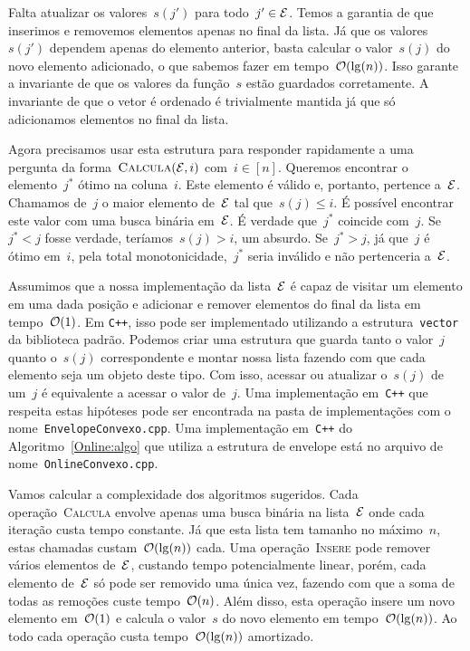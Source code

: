 Falta atualizar os valores~$s(j')$ para todo~$j' \in \mathcal{E}$. Temos a garantia de que inserimos e removemos elementos apenas no final da lista. Já que os valores~$s(j')$ dependem apenas do elemento anterior, basta calcular o valor~$s(j)$ do novo elemento adicionado, o que sabemos fazer em tempo~$\mathcal{O}(\lg(n))$. Isso garante a invariante de que os valores da função~$s$ estão guardados corretamente. A invariante de que o vetor é ordenado é trivialmente mantida já que só adicionamos elementos no final da lista.

Agora precisamos usar esta estrutura para responder rapidamente a uma pergunta da forma~${ \textsc{Calcula}(\mathcal{E},i) }$ com~$i \in [n]$. Queremos encontrar o elemento~$j^*$ ótimo na coluna~$i$. Este elemento é válido e, portanto, pertence a~$\mathcal{E}$. Chamamos de~$j$ o maior elemento de~$\mathcal{E}$ tal que~$s(j) \leq i$. É possível encontrar este valor com uma busca binária em~$\mathcal{E}$. É verdade que~$j^*$ coincide com~$j$. Se~${ j^* < j }$ fosse verdade, teríamos~${ s(j) > i }$, um absurdo. Se~${ j^* > j }$, já que~$j$ é ótimo em~$i$, pela total monotonicidade,~$j^*$ seria inválido e não pertenceria a~$\mathcal{E}$.

Assumimos que a nossa implementação da lista~$\mathcal{E}$ é capaz de visitar um elemento em uma dada posição e adicionar e remover elementos do final da lista em tempo~$\mathcal{O}(1)$. Em \texttt{C++}, isso pode ser implementado utilizando a estrutura~\texttt{vector} da biblioteca padrão. Podemos criar uma estrutura que guarda tanto o valor~$j$ quanto o~$s(j)$ correspondente e montar nossa lista fazendo com que cada elemento seja um objeto deste tipo. Com isso, acessar ou atualizar o~$s(j)$ de um~$j$ é equivalente a acessar o valor de~$j$. Uma implementação em~\texttt{C++} que respeita estas hipóteses pode ser encontrada na pasta de implementações com o nome~\texttt{EnvelopeConvexo.cpp}. Uma implementação em~\texttt{C++} do Algoritmo~\ref{Online:algo} que utiliza a estrutura de envelope está no arquivo de nome~\texttt{OnlineConvexo.cpp}.

Vamos calcular a complexidade dos algoritmos sugeridos. Cada operação~\textsc{Calcula} envolve apenas uma busca binária na lista~$\mathcal{E}$ onde cada iteração custa tempo constante. Já que esta lista tem tamanho no máximo~$n$, estas chamadas custam~$\mathcal{O}(\lg(n))$ cada. Uma operação~\textsc{Insere} pode remover vários elementos de~$\mathcal{E}$, custando tempo potencialmente linear, porém, cada elemento de~$\mathcal{E}$ só pode ser removido uma única vez, fazendo com que a soma de todas as remoções custe tempo~$\mathcal{O}(n)$. Além disso, esta operação insere um novo elemento em~$\mathcal{O}(1)$ e calcula o valor~$s$ do novo elemento em tempo~$\mathcal{O}(\lg(n))$. Ao todo cada operação custa tempo~$\mathcal{O}(\lg(n))$ amortizado.

